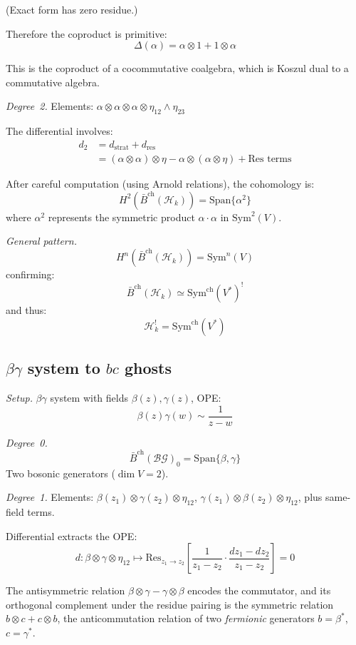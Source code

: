 (Exact form has zero residue.)

Therefore the coproduct is primitive:
\[\Delta(\alpha) = \alpha \otimes 1 + 1 \otimes \alpha\]

This is the coproduct of a cocommutative coalgebra, which is Koszul dual to a
commutative algebra.

\emph{Degree~2.}
Elements: $\alpha \otimes \alpha \otimes \alpha \otimes \eta_{12} \wedge \eta_{23}$

The differential involves:
\begin{align*}
d_2 &= d_{\text{strat}} + d_{\text{res}} \\
&= (\alpha \otimes \alpha) \otimes \eta - \alpha \otimes (\alpha \otimes \eta) + 
    \text{Res terms}
\end{align*}

After careful computation (using Arnold relations), the cohomology is:
\[H^2(\bar{B}^{\text{ch}}(\mathcal{H}_k)) = \text{Span}\{\alpha^2\}\]
where $\alpha^2$ represents the symmetric product $\alpha \cdot \alpha$ in 
$\text{Sym}^2(V)$.

\emph{General pattern.}
\[H^n(\bar{B}^{\text{ch}}(\mathcal{H}_k)) = \text{Sym}^n(V)\]
confirming:
\[\bar{B}^{\text{ch}}(\mathcal{H}_k) \simeq \mathrm{Sym}^{\mathrm{ch}}(V^*)^!\]
and thus:
\[\mathcal{H}_k^! = \mathrm{Sym}^{\mathrm{ch}}(V^*)\]

\subsection{\texorpdfstring{$\beta\gamma$ system to $bc$ ghosts}{Beta-gamma system to bc ghosts}}

\noindent\emph{Setup.} $\beta\gamma$ system with fields $\beta(z), \gamma(z)$, OPE:
\[\beta(z)\gamma(w) \sim \frac{1}{z-w}\]

\emph{Degree~0.}
\[\bar{B}^{\text{ch}}(\mathcal{BG})_0 = \text{Span}\{\beta, \gamma\}\]
Two bosonic generators ($\dim V = 2$).

\emph{Degree~1.}
Elements: $\beta(z_1) \otimes \gamma(z_2) \otimes \eta_{12}$,
$\gamma(z_1) \otimes \beta(z_2) \otimes \eta_{12}$, plus same-field terms.

Differential extracts the OPE:
\[d: \beta \otimes \gamma \otimes \eta_{12} \mapsto
   \text{Res}_{z_1 \to z_2}\left[\frac{1}{z_1-z_2} \cdot \frac{dz_1-dz_2}{z_1-z_2}\right] = 0\]

The antisymmetric relation $\beta \otimes \gamma - \gamma \otimes \beta$ encodes the commutator, and
its orthogonal complement under the residue pairing is the symmetric relation $b \otimes c + c \otimes b$,
the anticommutation relation of two \emph{fermionic} generators $b = \beta^*$, $c = \gamma^*$.

